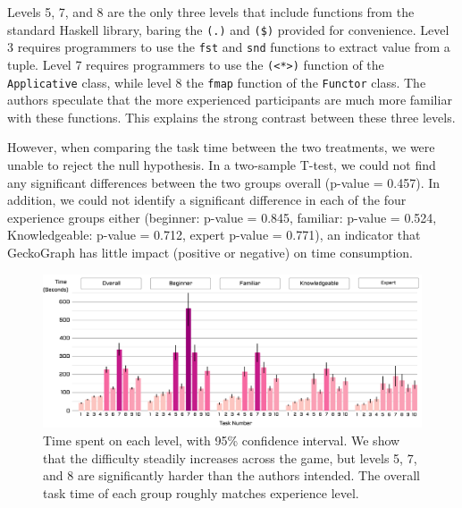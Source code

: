 Levels 5, 7, and 8 are the only three levels that include functions from the standard Haskell library, baring the \texttt{(.)} and \texttt{(\$)} provided for convenience. Level 3 requires programmers to use the \texttt{fst} and \texttt{snd} functions to extract value from a tuple. Level 7 requires programmers to use the \texttt{(<*>)} function of the \texttt{Applicative} class, while level 8 the \texttt{fmap} function of the \texttt{Functor} class. The authors speculate that the more experienced participants are much more familiar with these functions. This explains the strong contrast between these three levels. 


However, when comparing the task time between the two treatments, we were unable to reject the null hypothesis. In a two-sample T-test, we could not find any significant differences between the two groups overall (p-value = 0.457). In addition, we could not identify a significant difference in each of the four experience groups either (beginner: p-value = 0.845, familiar: p-value = 0.524, Knowledgeable: p-value = 0.712, expert p-value = 0.771), an indicator that GeckoGraph has little impact (positive or negative) on time consumption.


\begin{figure}[hbt]
  \includegraphics[width=\linewidth]{figures/LevelTime}
  \caption[Time spent on each level, with 95\% confidence interval]{\label{fig:level-time} Time spent on each level, with 95\% confidence interval. We show that the difficulty steadily increases across the game, but levels 5, 7, and 8 are significantly harder than the authors intended. The overall task time of each group roughly matches experience level.}
\end{figure}


